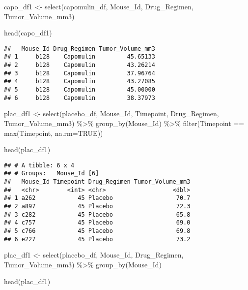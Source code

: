 \documentclass[
]{article}
\newenvironment{Shaded}{\begin{snugshade}}{\end{snugshade}}
\newcommand{\AttributeTok}[1]{\textcolor[rgb]{0.77,0.63,0.00}{#1}}
\newcommand{\ConstantTok}[1]{\textcolor[rgb]{0.00,0.00,0.00}{#1}}
\newcommand{\FunctionTok}[1]{\textcolor[rgb]{0.00,0.00,0.00}{#1}}
\newcommand{\NormalTok}[1]{#1}
\newcommand{\OtherTok}[1]{\textcolor[rgb]{0.56,0.35,0.01}{#1}}
\newcommand{\SpecialCharTok}[1]{\textcolor[rgb]{0.00,0.00,0.00}{#1}}
\begin{document}
\begin{Shaded}
\begin{Highlighting}[]
\NormalTok{capo\_df1 }\OtherTok{\textless{}{-}} \FunctionTok{select}\NormalTok{(capomulin\_df, Mouse\_Id, Drug\_Regimen, Tumor\_Volume\_mm3)}

\FunctionTok{head}\NormalTok{(capo\_df1)}
\end{Highlighting}
\end{Shaded}

\begin{verbatim}
##   Mouse_Id Drug_Regimen Tumor_Volume_mm3
## 1     b128    Capomulin         45.65133
## 2     b128    Capomulin         43.26214
## 3     b128    Capomulin         37.96764
## 4     b128    Capomulin         43.27085
## 5     b128    Capomulin         45.00000
## 6     b128    Capomulin         38.37973
\end{verbatim}

\begin{Shaded}
\begin{Highlighting}[]
\NormalTok{plac\_df1 }\OtherTok{\textless{}{-}} \FunctionTok{select}\NormalTok{(placebo\_df, Mouse\_Id, Timepoint, Drug\_Regimen, Tumor\_Volume\_mm3) }\SpecialCharTok{\%\textgreater{}\%}
  \FunctionTok{group\_by}\NormalTok{(Mouse\_Id) }\SpecialCharTok{\%\textgreater{}\%}
  \FunctionTok{filter}\NormalTok{(Timepoint }\SpecialCharTok{==} \FunctionTok{max}\NormalTok{(Timepoint, }\AttributeTok{na.rm=}\ConstantTok{TRUE}\NormalTok{))}

\FunctionTok{head}\NormalTok{(plac\_df1)}
\end{Highlighting}
\end{Shaded}

\begin{verbatim}
## # A tibble: 6 x 4
## # Groups:   Mouse_Id [6]
##   Mouse_Id Timepoint Drug_Regimen Tumor_Volume_mm3
##   <chr>        <int> <chr>                   <dbl>
## 1 a262            45 Placebo                  70.7
## 2 a897            45 Placebo                  72.3
## 3 c282            45 Placebo                  65.8
## 4 c757            45 Placebo                  69.0
## 5 c766            45 Placebo                  69.8
## 6 e227            45 Placebo                  73.2
\end{verbatim}

\begin{Shaded}
\begin{Highlighting}[]
\NormalTok{plac\_df1 }\OtherTok{\textless{}{-}} \FunctionTok{select}\NormalTok{(placebo\_df, Mouse\_Id, Drug\_Regimen, Tumor\_Volume\_mm3) }\SpecialCharTok{\%\textgreater{}\%}
  \FunctionTok{group\_by}\NormalTok{(Mouse\_Id)}

\FunctionTok{head}\NormalTok{(plac\_df1)}
\end{Highlighting}
\end{Shaded}
\end{document}
